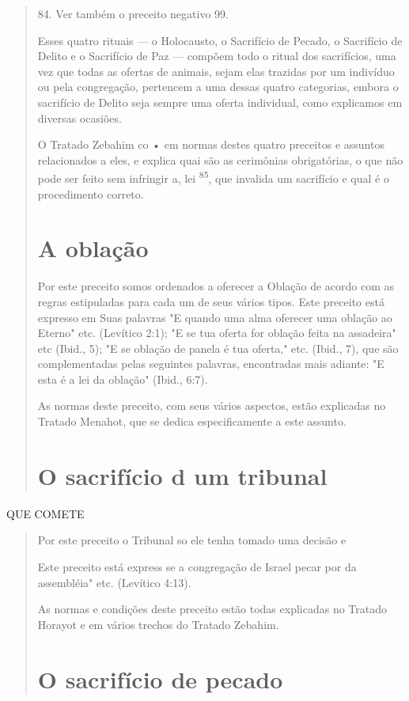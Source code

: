 \begin{quote}
84. Ver também o preceito negativo 99.

Esses quatro rituais --- o Holocausto, o Sacrifício de Pecado, o
Sacri­fício de Delito e o Sacrifício de Paz --- compõem todo o ritual
dos sacrifícios, uma vez que todas as ofertas de animais, sejam elas
trazidas por um indivíduo ou pela congregação, pertencem a uma dessas
quatro categorias, embora o sa­crifício de Delito seja sempre uma oferta
individual, como explicamos em di­versas ocasiões.

O Tratado Zebahim co • em normas destes quatro preceitos e as­suntos
relacionados a eles, e explica quai são as cerimônias obrigatórias, o
que não pode ser feito sem infringir a, lei \textsuperscript{85}, que
invalida um sacrifício e qual é o procedimento correto.

\section{A oblação}

Por este preceito somos ordenados a oferecer a Oblação de acordo com as
regras estipuladas para cada um de seus vários tipos. Este preceito está
expresso em Suas palavras "E quando uma alma oferecer uma oblação ao
Eter­no" etc. (Levítico 2:1); "E se tua oferta for oblação feita na
assadeira" etc (Ibid., 5); "E se oblação de panela é tua oferta," etc.
(Ibid., 7), que são complementa­das pelas seguintes palavras,
encontradas mais adiante: "E esta é a lei da obla­ção" (Ibid., 6:7).

As normas deste preceito, com seus vários aspectos, estão explica­das no
Tratado Menahot, que se dedica especificamente a este assunto.

\section{O sacrifício d um tribunal}
\end{quote}

QUE COMETE

\begin{quote}
Por este preceito o Tribunal so ele tenha tomado uma decisão e

Este preceito está express se a congregação de Israel pecar por da
assembléia" etc. (Levítico 4:13).

As normas e condições deste preceito estão todas explicadas no Tra­tado
Horayot e em vários trechos do Tratado Zebahim.

\section{O sacrifício de pecado}
\end{quote}

